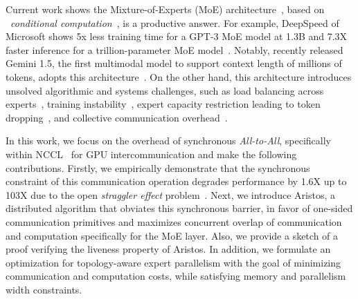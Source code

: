 Current work shows the Mixture-of-Experts (MoE) architecture~\cite{ShazeerMMDLHD17},
based on ~\emph{conditional computation}~\cite{doi:10.1142/S0218001403002411}, is a productive answer.
For example, DeepSpeed of Microsoft shows 5x less training time for a GPT-3 MoE model at 1.3B and
7.3X faster inference for a trillion-parameter MoE model~\cite{pmlr-v162-rajbhandari22a}.
Notably, recently released Gemini 1.5, the first multimodal model to support context length of millions of tokens,
adopts this architecture~\cite{Gemini_Team_2024}.
On the other hand, this architecture introduces unsolved algorithmic and systems challenges,
such as load balancing across experts~\cite{ShazeerMMDLHD17}, training instability~\cite{NEURIPS2022_3e67e84a},
expert capacity restriction leading to token dropping~\cite{gale2022megablocks, DBLP:journals/corr/abs-2101-03961},
and collective communication overhead~\cite{DBLP:journals/corr/abs-2006-16668}.

In this work, we focus on the overhead of synchronous \emph{All-to-All},
specifically within NCCL~\cite{nccl} for GPU intercommunication and make the following contributions.
Firstly, we empirically demonstrate that the synchronous constraint of this
communication operation degrades performance by 1.6X up to 103X due to
the open \emph{straggler effect} problem~\cite{10.1145/2987550.2987554, deepspeedcomm}.
Next, we introduce Aristos, a distributed algorithm
that obviates this synchronous barrier, in favor of one-sided communication primitives and maximizes
concurrent overlap of communication and computation specifically for the MoE layer.
Also, we provide a sketch of a proof verifying the liveness property of Aristos.
In addition, we formulate an optimization for topology-aware expert parallelism
with the goal of minimizing communication and computation costs,
while satisfying memory and parallelism width constraints.
   
